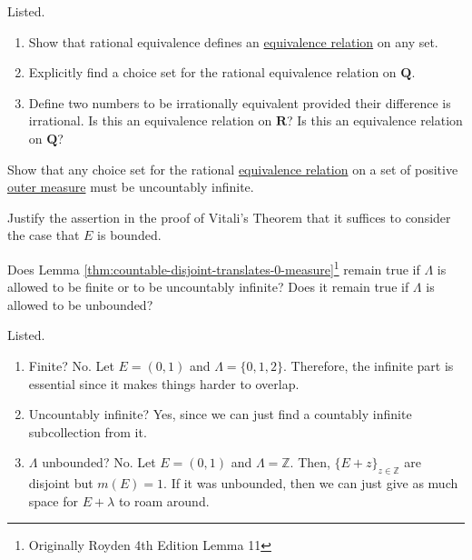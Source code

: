   \begin{exercise}[Royden 2.29]
    Listed. 
    \begin{enumerate}
      \item Show that rational equivalence defines an \hyperref[st-def:equivalence_relation]{equivalence relation} on any set.
      \item Explicitly find a choice set for the rational equivalence relation on $\mathbf{Q}$.
      \item Define two numbers to be irrationally equivalent provided their difference is irrational. Is this an equivalence relation on $\mathbf{R}$? Is this an equivalence relation on $\mathbf{Q}$?
    \end{enumerate}
  \end{exercise}

  \begin{exercise}[Royden 2.30]
    Show that any choice set for the rational \hyperref[st-def:equivalence_relation]{equivalence relation} on a set of positive \hyperref[def:outer-measure]{outer measure} must be uncountably infinite.
  \end{exercise}

  \begin{exercise}[Royden 2.31]
    Justify the assertion in the proof of Vitali's Theorem that it suffices to consider the case that $E$ is bounded.
  \end{exercise}

  \begin{exercise}[Royden 2.32]
    Does Lemma \ref{thm:countable-disjoint-translates-0-measure}\footnote{Originally Royden 4th Edition Lemma 11} remain true if $\Lambda$ is allowed to be finite or to be uncountably infinite? Does it remain true if $\Lambda$ is allowed to be unbounded?
  \end{exercise}
  \begin{solution}
    Listed. 
    \begin{enumerate}
      \item Finite? No. Let $E = (0, 1)$ and $\Lambda = \{0, 1, 2\}$. Therefore, the infinite part is essential since it makes things harder to overlap. 
      \item Uncountably infinite? Yes, since we can just find a countably infinite subcollection from it. 
      \item $\Lambda$ unbounded? No. Let $E = (0, 1)$ and $\Lambda = \mathbb{Z}$. Then, $\{E + z\}_{z \in \mathbb{Z}}$ are disjoint but $m(E) = 1$. If it was unbounded, then we can just give as much space for $E + \lambda$ to roam around.  
    \end{enumerate}
  \end{solution}

